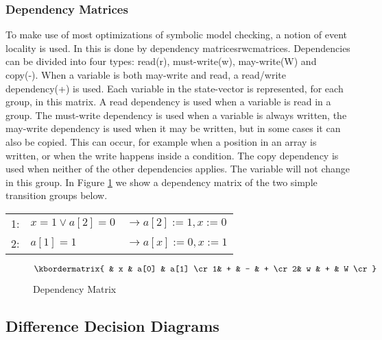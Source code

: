 \subsubsection{Dependency Matrices}
To make use of most optimizations of symbolic model checking, a notion of event locality is used. In \ltsmin{} this is done by dependency matrices{rwcmatrices}. Dependencies can be divided into four types: read(r), must-write(w), may-write(W) and copy(-). When a variable is both may-write and read, a read/write dependency(+) is used. Each variable in the state-vector is represented, for each group, in this matrix. A read dependency is used when a variable is read in a group. The must-write dependency is used when a variable is always written, the may-write dependency is used when it may be written, but in some cases it can also be copied. This can occur, for example when a position in an array is written, or when the write happens inside a condition. The copy dependency is used when neither of the other dependencies applies. The variable will not change in this group. In Figure \ref{fig:dep_matrix} we show a dependency matrix of the two simple transition groups below.
\begin{center}
    \begin{tabular}{lll}
    1: & $x = 1 \vee a[2] = 0$ & $\rightarrow a[2] := 1, x:=0$  \\
    2: & $a[1] = 1$                     & $\rightarrow a[x] := 0, x:= 1$ \\
    \end{tabular}
\end{center}

\begin{figure}[h]
\centering
	\begin{math}
 \kbordermatrix{ 		               & x & a[0] & a[1] \cr
 									  1& + & -    & +    \cr
 									  2& w & +    & W    \cr}
	\end{math}
	\caption{Dependency Matrix}
	\label{fig:dep_matrix}
\end{figure}

\subsection{Difference Decision Diagrams}


